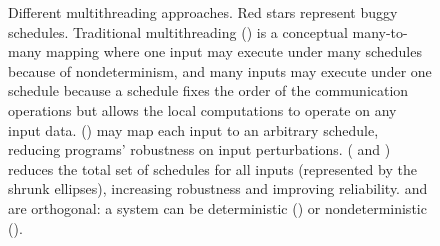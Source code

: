 \begin{figure}[t]
\begin{center}
\vspace{-.05in}
\caption{Different multithreading approaches. Red stars represent buggy
schedules. Traditional multithreading () is a conceptual
many-to-many mapping where one input may execute under many schedules because of
nondeterminism, and many inputs may execute under one schedule because a
schedule fixes the order of the communication operations but allows the local
computations to operate on any input data. \dmt () may map each
input to an arbitrary schedule, reducing programs' robustness on input
perturbations. \smt ( and ) reduces the total
set of schedules for all inputs (represented by the shrunk ellipses), increasing
robustness and improving reliability. \smt and \dmt are orthogonal: a \smt
system can be deterministic () or nondeterministic
().}
\vspace{-.2in}
\end{center}
\end{figure}

